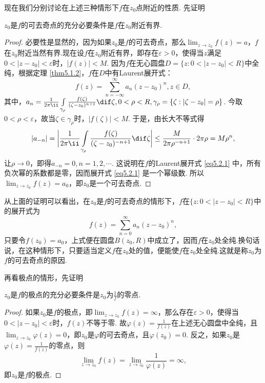 现在我们分别讨论在上述三种情形下$f$在$z_0$点附近的性质. 先证明
\begin{theorem}\label{thm5.2.1}
$z_0$是$f$的可去奇点的充分必要条件是$f$在$z_0$附近有界.
\end{theorem}
\begin{proof}
必要性是显然的，因为如果$z_0$是$f$的可去奇点，那么$\lim_{z\to z_0}f(z)=a$，$f$在$z_0$附近当然有界.现在设$f$在$z_0$附近有界，即存在$\varepsilon>0$，使得当$z$满足$0<|z-z_0|<\varepsilon$时，$|f(z)|<M$. 因为$f$在无心圆盘$D=\{z:0<|z-z_0|<R\}$中全纯，根据定理 \ref{thm5.1.2}，$f$在$D$中有Laurent展开式：
\begin{equation}\label{eq5.2.1}
f(z)=\sum_{n=-\infty}^\infty a_n(z-z_0)^n,z\in D,
\end{equation}
其中，$a_n=\frac1{2\pi\ii}\int\limits_{\gamma_\rho}\frac{f(\zeta)}{(\zeta-z_0)^{n+1}}
\dif \zeta,0<\rho<R,\gamma_{\rho}=\{\zeta:|\zeta-z_0|=\rho\}$. 今取$0<\rho<\varepsilon$，故当$\zeta\in\gamma_\rho$时，$|f(\zeta)|<M$. 于是，由长大不等式得
\[|a_{-n}|=\bigg|\frac1{2\pi\ii}\int\limits_{\gamma_\rho}
\frac{f(\zeta)}{(\zeta-z_0)^{-n+1}}\dif \zeta\bigg|\le
\frac M{2\pi\rho^{-n+1}}\cdot2\pi\rho=M\rho^n,\]
让$\rho\to0$，即得$a_{-n}=0,n=1,2,\cdots$. 这说明在$f$的Laurent展开式 \eqref{eq5.2.1} 中，所有负次幂的系数都是零，因而展开式 \eqref{eq5.2.1} 是一个幂级数. 所以$\lim_{z\to z_0}f(z)=a_0$，即$z_0$是一个可去奇点.
\end{proof}

从上面的证明可以看出，在$z_0$是$f$的可去奇点的情形下，$f$在$\{z:0<|z-z_0|<R\}$中的展开式为
\[f(z)=\sum_{n=0}^\infty a_n(z-z_0)^n,\]
只要令$f(z_0)=a_0$，上式便在圆盘$B(z_0,R)$中成立了，因而$f$在$z_0$处全纯.换句话说，在这种情形下，只要适当定义$f$在$z_0$处的值，便能使$f$在$z_0$处全纯.这就是称$z_0$为$f$的可去奇点的原因.

再看极点的情形，先证明
\begin{prop}\label{prop5.2.2}
$z_0$是$f$的极点的充分必要条件是$z_0$为$\frac1f$的零点.
\end{prop}
\begin{proof}
如果$z_0$是$f$的极点，即$\lim_{z\to z_0}f(z)=\infty$，那么存在$\varepsilon>0$，使得当$0<|z-z_0|<\varepsilon$时，$f(z)$不等于零. 故$\varphi(z)=\frac1{f(z)}$在上述无心圆盘中全纯，且$\lim_{z\to z_0}\varphi(z)=0$，即$z_0$是$\varphi$的可去奇点，且$\varphi(z_0)=0$. 反之，如果$z_0$是$\varphi(z)=\frac1{f(z)}$的零点，则
\[\lim_{z\to z_0}f(z)=\lim_{z\to z_0}\frac1{\varphi(z)}=\infty,\]
即$z_0$是$f$的极点.
\end{proof}

